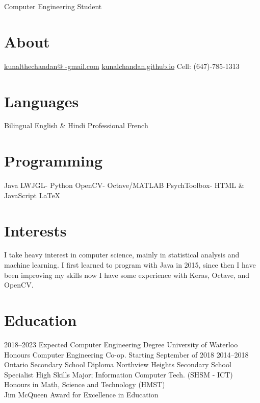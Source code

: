 \documentclass[]{chandan-cv}
\begin{document}
       {Computer Engineering Student}


\begin{aside}
  \section{About}
    \href{mailto:kunalthechandan@gmail.com}{kunalthechandan@ -gmail.com}
    \href{https://kunalchandan.github.io}{kunalchandan.github.io}
    Cell: (647)-785-1313
  \section{Languages}
    Bilingual English \& Hindi
    Professional French
  \section{Programming}
    Java
    LWJGL-
    Python
    OpenCV-
    Octave/MATLAB
    PsychToolbox-
    HTML \& JavaScript
    LaTeX
\end{aside}

\section{Interests}

I take heavy interest in computer science, mainly in statistical analysis and machine learning. I first learned to program with Java in 2015, since then I have been improving my skills now I have some experience with Keras, Octave, and OpenCV.

\section{Education}

\begin{entrylist}
  \entry
    {2018–2023}
    {Expected Computer Engineering Degree{\normalfont}}
    {University of Waterloo}
    {Honours Computer Engineering Co-op. Starting September of 2018}
  \entry
    {2014–2018}
    {Ontario Secondary School Diploma{\normalfont}}
    {Northview Heights Secondary School}
    {Specialist High Skills Major; Information Computer Tech. (SHSM - ICT)
     \\Honours in Math, Science and Technology (HMST)
     \\Jim McQueen Award for Excellence in Education}
\end{entrylist}
\end{document}
